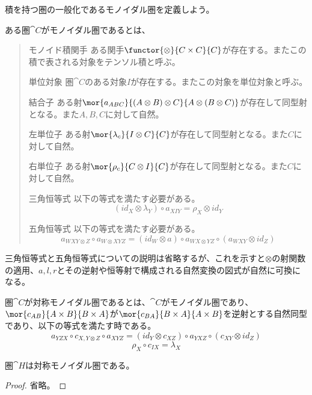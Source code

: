 \documentclass[uplatex,dvipdfmx]{jsarticle}
\begin{document}
  積を持つ圏の一般化であるモノイダル圏を定義しよう。
  \begin{define}[モノイダル圏]\label{def-monoidal-cat}
    ある圏$\cat{C}$がモノイダル圏であるとは、
    \begin{quote}
      \begin{mydescription}
        \item[モノイド積関手]
        ある関手$\functor{\otimes}{C\times C}{C}$が存在する。またこの積で表される対象をテンソル積と呼ぶ。
        \item[単位対象]圏$\cat{C}$のある対象$I$が存在する。またこの対象を単位対象と呼ぶ。
        \item[結合子]ある射$\mor{a_{ABC}}{(A\otimes B)\otimes C}{A\otimes(B\otimes C)}$が存在して同型射となる。また$A,B,C$に対して自然。
        \item[左単位子]ある射$\mor{\lambda_c}{I\otimes C}{C}$が存在して同型射となる。また$C$に対して自然。
        \item[右単位子]ある射$\mor{\rho_c}{C\otimes I}{C}$が存在して同型射となる。また$C$に対して自然。
        \item[三角恒等式]以下の等式を満たす必要がある。
        \[(id_X\otimes \lambda_Y)\circ a_{XIY}=\rho_X\otimes id_Y\]
        \item[五角恒等式]以下の等式を満たす必要がある。
        \[a_{WXY\otimes Z}\circ a_{W\otimes XYZ}=(id_W\otimes a)\circ a_{WX\otimes YZ}\circ(a_{WXY}\otimes id_Z) \]
      \end{mydescription}
    \end{quote}
  \end{define}
  三角恒等式と五角恒等式についての説明は省略するが、これを示すと$\otimes$の射関数の適用、$a,l,r$とその逆射や恒等射で構成される自然変換の図式が自然に可換になる。
  \begin{define}[対称モノイダル圏]\label{def-symmetric-monoidal-cat}
    圏$\cat{C}$が対称モノイダル圏であるとは、$\cat{C}$がモノイダル圏であり、$\mor{c_{AB}}{A\times B}{B\times A}$が$\mor{c_{BA}}{B\times A}{A\times B}$を逆射とする自然同型であり、以下の等式を満たす時である。
    \[a_{YZX}\circ c_{X,Y\otimes Z}\circ a_{XYZ}=(id_Y\otimes c_{XZ})\circ a_{YXZ}\circ(c_{XY}\otimes id_Z)\]
    \[\rho_{X}\circ c_{IX} = \lambda_{X}\]
  \end{define}
  \begin{prop}\label{prop-h-is-smc}
    圏$\cat{H}$は対称モノイダル圏である。
  \end{prop}
  \begin{proof}
    省略。
  \end{proof}
\end{document}
